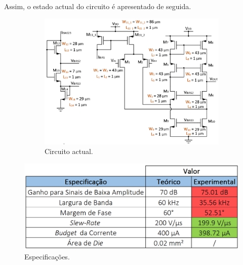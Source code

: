 \documentclass[11pt]{article}
\numberwithin{equation}{section}
\begin{document}
Assim, o estado actual do circuito é apresentado de seguida. 

\begin{figure}[h]
	\centering
	\begin{minipage}[c]{0.58\textwidth}
		\begin{figure}[H]
			\includegraphics[keepaspectratio=true, scale=0.34]{teoricas/ajuste1}
			\caption{Circuito actual.}
			\vspace{-0.8em}
		\end{figure}
	\end{minipage}
	\begin{minipage}[c]{0.24\textwidth}
		\centering
		\begin{table}[H]
			\centering
			\caption{Especificações.}
			\vspace{-1.5mm}
			\includegraphics[keepaspectratio=true, scale=0.33]{teoricas/tabajuste1}
		\end{table}
	\end{minipage}	
\end{figure}

\vspace{-2mm}
\end{document}

